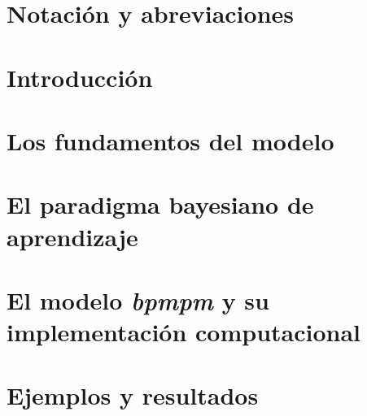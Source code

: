 \documentclass[pdftex,10pt, oneside]{book}
\theoremstyle{plain}
\theoremstyle{definition}
\begin{document}

%


\frontmatter



\tableofcontents
\listoffigures
\listoftables

\chapter{Notación y abreviaciones} \label{ap:Notacion}



\mainmatter
\chapter{Introducción} \label{cap:Intro}


\chapter{Los fundamentos del modelo} \label{cap:Modelo}


\chapter{El paradigma bayesiano de aprendizaje} \label{cap:BayesAlgoritmo}


\chapter{El modelo \textit{bpmpm} y su implementación computacional} \label{cap:bpwpm}


\chapter{Ejemplos y resultados} \label{cap:EjYRes}

\end{document}
